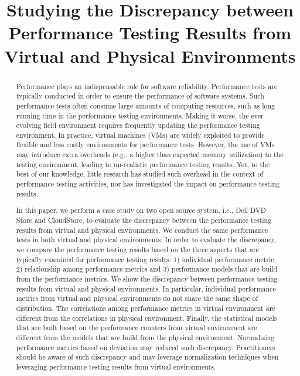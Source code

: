 \documentclass[10pt, conference]{IEEEtran}
\begin{document}
\title{Studying the Discrepancy between Performance Testing Results from Virtual and Physical Environments}

\author{

}

\maketitle

\begin{abstract}
Performance plays an indispensable role for software reliability. 
Performance tests are typically conducted in order to ensure the performance of software systems. Such performance tests often consume large amounts of computing resources, such as long running time in the performance testing environments. Making it worse, the ever evolving field environment requires frequently updating the performance testing environment. In practice, virtual machines (VMs) are widely exploited to provide flexible and less costly environments for performance tests. However, the use of VMs may introduce extra overheads (e.g., a higher than expected memory utilization) to the testing environment, leading to un-realistic performance testing results. Yet, to the best of our knowledge, little research has studied such overhead in the context of performance testing activities, nor has investigated the impact on performance testing results. 
		
In this paper, we perform a case study on two open source system, i.e., Dell DVD Store and CloudStore, to evaluate the discrepancy between the performance testing results from virtual and physical environments. We conduct the same performance tests in both virtual and physical environments. In order to evaluate the discrepancy, we compare the performance testing results based on the three aspects that are typically examined for performance testing results: 1) individual performance metric, 2) relationship among performance metrics and 3) performance models that are build from the performance metrics. We show the discrepancy between performance testing results from virtual and physical environments. In particular, individual performance metrics from virtual and physical environments do not share the same shape of distribution. The correlations among performance metrics in virtual environment are different from the correlations in physical environment. Finally, the statistical models that are built based on the performance counters from virtual environment are different from the models that are build from the physical environment. Normalizing performance metrics based on deviation may reduced such discrepancy. Practitioners should be aware of such discrepancy and may leverage normalization techniques when leveraging performance testing results from virtual environments.



\end{abstract}
\end{document}
